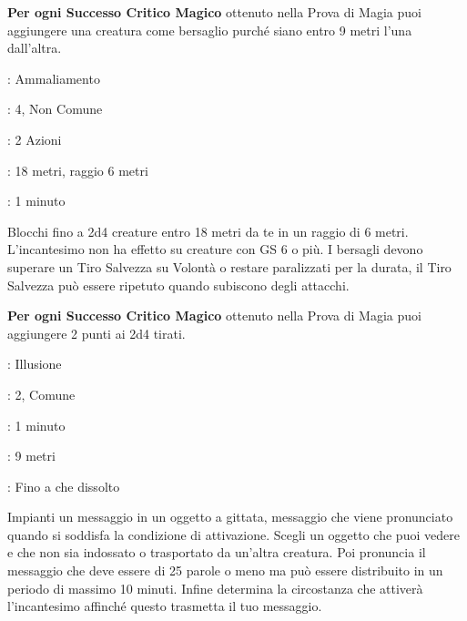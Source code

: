 \begin{multicols}{2}
\textbf{Per ogni Successo Critico Magico} ottenuto nella Prova di Magia puoi aggiungere una creatura come bersaglio purché siano entro 9 metri l'una dall'altra.

\noindent\colorbox{OBSSgold!10}{
\begin{minipage}{0.95\linewidth}
\begin{description}[noitemsep, topsep=0pt, parsep=0pt, partopsep=0pt, leftmargin=0cm, labelwidth=1.3cm]
	\item[\textbf{Lista}]: Ammaliamento
	\item[\textbf{Livello}]: 4, Non Comune
	\item[\textbf{Lancio}]: 2 Azioni
	\item[\textbf{Gittata}]: 18 metri, raggio 6 metri
	\item[\textbf{Durata}]: 1 minuto
\end{description}
\end{minipage}}\smallskip

Blocchi fino a 2d4 creature entro 18 metri da te in un raggio di 6 metri. L'incantesimo non ha effetto su creature con GS 6 o più. I bersagli devono superare un Tiro Salvezza su Volontà o restare paralizzati per la durata, il Tiro Salvezza può essere ripetuto quando subiscono degli attacchi.

\textbf{Per ogni Successo Critico Magico} ottenuto nella Prova di Magia puoi aggiungere 2 punti ai 2d4 tirati.

\noindent\colorbox{OBSSgold!10}{
\begin{minipage}{0.95\linewidth}
\begin{description}[noitemsep, topsep=0pt, parsep=0pt, partopsep=0pt, leftmargin=0cm, labelwidth=1.3cm]
	\item[\textbf{Lista}]: Illusione
	\item[\textbf{Livello}]: 2, Comune
	\item[\textbf{Lancio}]: 1 minuto
	\item[\textbf{Gittata}]: 9 metri
	\item[\textbf{Durata}]: Fino a che dissolto
\end{description}
\end{minipage}}\smallskip

Impianti un messaggio in un oggetto a gittata, messaggio che viene pronunciato quando si soddisfa la condizione di attivazione. Scegli un oggetto che puoi vedere e che non sia indossato o trasportato da un'altra creatura. Poi pronuncia il messaggio che deve essere di 25 parole o meno ma può essere distribuito in un periodo di massimo 10 minuti. Infine determina la circostanza che attiverà l'incantesimo affinché questo trasmetta il tuo messaggio.


\end{multicols}
